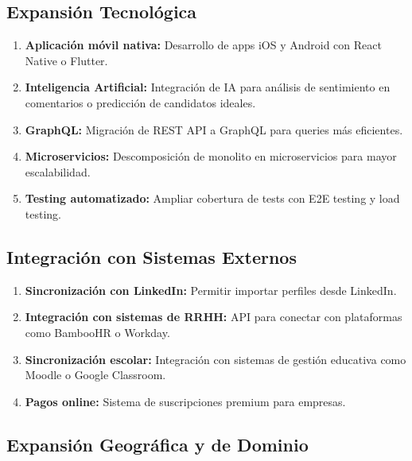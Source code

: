 \documentclass[a4paper]{report}
\begin{document}
\subsection*{Expansión Tecnológica}

\begin{enumerate}
  \item \textbf{Aplicación móvil nativa:} Desarrollo de apps iOS y Android con React Native o Flutter.
  
  \item \textbf{Inteligencia Artificial:} Integración de IA para análisis de sentimiento en comentarios o predicción de candidatos ideales.
  
  \item \textbf{GraphQL:} Migración de REST API a GraphQL para queries más eficientes.
  
  \item \textbf{Microservicios:} Descomposición de monolito en microservicios para mayor escalabilidad.
  
  \item \textbf{Testing automatizado:} Ampliar cobertura de tests con E2E testing y load testing.
\end{enumerate}

\subsection*{Integración con Sistemas Externos}

\begin{enumerate}
  \item \textbf{Sincronización con LinkedIn:} Permitir importar perfiles desde LinkedIn.
  
  \item \textbf{Integración con sistemas de RRHH:} API para conectar con plataformas como BambooHR o Workday.
  
  \item \textbf{Sincronización escolar:} Integración con sistemas de gestión educativa como Moodle o Google Classroom.
  
  \item \textbf{Pagos online:} Sistema de suscripciones premium para empresas.
\end{enumerate}

\subsection*{Expansión Geográfica y de Dominio}
\end{document}
